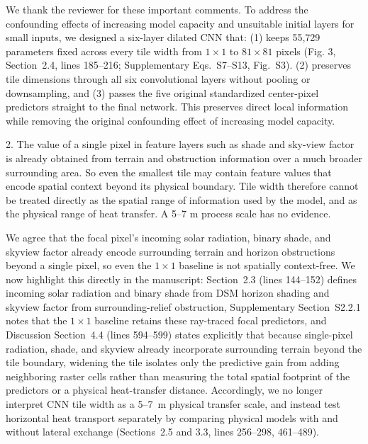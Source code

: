 \documentclass[12pt,english]{reviewresponse}
\begin{document}
\begin{revresponse}
We thank the reviewer for these important comments. To address the confounding effects of increasing model capacity and unsuitable initial layers for small inputs, we designed a six-layer dilated CNN that: (1) keeps 55,729 parameters fixed across every tile width from $1\times 1$ to $81\times 81$ pixels (Fig. 3, Section~2.4, lines 185--216; Supplementary Eqs.~S7--S13, Fig.~S3). (2) preserves tile dimensions through all six convolutional layers without pooling or downsampling, and (3) passes the five original standardized center-pixel predictors straight to the final network. This preserves direct local information while removing the original confounding effect of increasing model capacity.
\end{revresponse}

\begin{revcomment}
2. The value of a single pixel in feature layers such as shade and sky-view factor is already obtained from terrain and obstruction information over a much broader surrounding area. So even the smallest tile may contain feature values that encode spatial context beyond its physical boundary. Tile width therefore cannot be treated directly as the spatial range of information used by the model, and as the physical range of heat transfer. A 5–7 m process scale has no evidence.
\end{revcomment}

\begin{revresponse}
We agree that the focal pixel's incoming solar radiation, binary shade, and skyview factor already encode surrounding terrain and horizon obstructions beyond a single pixel, so even the $1\times 1$ baseline is not spatially context-free. We now highlight this directly in the manuscript: Section~2.3 (lines 144--152) defines incoming solar radiation and binary shade from DSM horizon shading and skyview factor from surrounding-relief obstruction, Supplementary Section~S2.2.1 notes that the $1\times 1$ baseline retains these ray-traced focal predictors, and Discussion Section~4.4 (lines 594--599) states explicitly that because single-pixel radiation, shade, and skyview already incorporate surrounding terrain beyond the tile boundary, widening the tile isolates only the predictive gain from adding neighboring raster cells rather than measuring the total spatial footprint of the predictors or a physical heat-transfer distance. Accordingly, we no longer interpret CNN tile width as a 5--7~m physical transfer scale, and instead test horizontal heat transport separately by comparing physical models with and without lateral exchange (Sections~2.5 and 3.3, lines 256--298, 461--489).
\end{revresponse}
\end{document}
